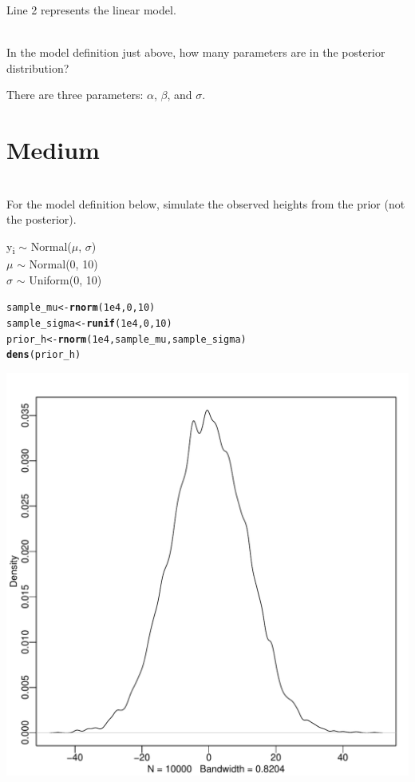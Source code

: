 \documentclass[12pt]{article}\usepackage[]{graphicx}\usepackage[]{color}
\makeatletter
\def\maxwidth{ %
  \ifdim\Gin@nat@width>\linewidth
    \linewidth
  \else
    \Gin@nat@width
  \fi
}
\newcommand{\hlnum}[1]{\textcolor[rgb]{0.686,0.059,0.569}{#1}}%
\newcommand{\hlstd}[1]{\textcolor[rgb]{0.345,0.345,0.345}{#1}}%
\newcommand{\hlkwb}[1]{\textcolor[rgb]{0.69,0.353,0.396}{#1}}%
\newcommand{\hlkwd}[1]{\textcolor[rgb]{0.737,0.353,0.396}{\textbf{#1}}}%
\newenvironment{kframe}{%
 \def\at@end@of@kframe{}%
 \ifinner\ifhmode%
  \def\at@end@of@kframe{\end{minipage}}%
  \begin{minipage}{\columnwidth}%
 \fi\fi%
 \def\FrameCommand##1{\hskip\@totalleftmargin \hskip-\fboxsep
 \colorbox{shadecolor}{##1}\hskip-\fboxsep
     \hskip-\linewidth \hskip-\@totalleftmargin \hskip\columnwidth}%
 \MakeFramed {\advance\hsize-\width
   \@totalleftmargin\z@ \linewidth\hsize
   \@setminipage}}%
 {\par\unskip\endMakeFramed%
 \at@end@of@kframe}
\newenvironment{knitrout}{}{} %
\newenvironment{problem}[2][Problem]{\begin{trivlist}
\item[\hskip \labelsep {\bfseries #1}\hskip \labelsep {\bfseries #2.}]}{\end{trivlist}}
\makeatother
\begin{document}
Line 2 represents the linear model.

\begin{problem}{4E5}
\text{ }\\
In the model definition just above, how many parameters are in the posterior distribution?
\end{problem}

There are three parameters: $\alpha$, $\beta$, and $\sigma$.

\section{Medium}

\begin{problem}{4M1}
\text{}\\
For the model definition below, simulate the observed heights from the prior (not the posterior).
\begin{center}
y\textsubscript{i} $\sim$ Normal($\mu$, $\sigma$)\\
$\mu$ $\sim$ Normal(0, 10)\\
$\sigma$ $\sim$ Uniform(0, 10)
\end{center}
\end{problem}

\begin{knitrout}
\color{fgcolor}\begin{kframe}
\begin{alltt}
\hlstd{sample_mu} \hlkwb{<-} \hlkwd{rnorm}\hlstd{(}\hlnum{1e4}\hlstd{,} \hlnum{0}\hlstd{,} \hlnum{10}\hlstd{)}
\hlstd{sample_sigma} \hlkwb{<-} \hlkwd{runif}\hlstd{(}\hlnum{1e4}\hlstd{,} \hlnum{0}\hlstd{,} \hlnum{10}\hlstd{)}
\hlstd{prior_h} \hlkwb{<-} \hlkwd{rnorm}\hlstd{(}\hlnum{1e4}\hlstd{, sample_mu, sample_sigma)}
\hlkwd{dens}\hlstd{(prior_h)}
\end{alltt}
\end{kframe}
\includegraphics[width=\maxwidth]{figure/unnamed-chunk-2-1} 

\end{knitrout}
\end{document}

